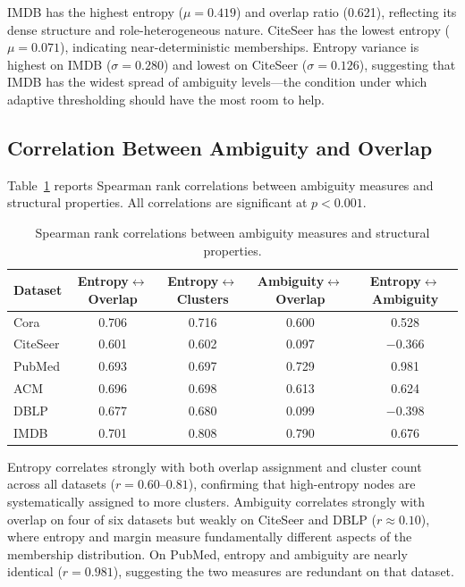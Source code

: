 \documentclass[a4paper,11pt,oneside,onecolumn,preprint]{elsarticle}
\numberwithin{equation}{section}
\begin{document}
IMDB has the highest entropy ($\mu = 0.419$) and overlap ratio (0.621), reflecting its dense structure and role-heterogeneous nature.
CiteSeer has the lowest entropy ($\mu = 0.071$), indicating near-deterministic memberships.
Entropy variance is highest on IMDB ($\sigma = 0.280$) and lowest on CiteSeer ($\sigma = 0.126$), suggesting that IMDB has the widest spread of ambiguity levels---the condition under which adaptive thresholding should have the most room to help.

\subsection{Correlation Between Ambiguity and Overlap}
\label{subsec:correlation}

Table~\ref{tab:correlations} reports Spearman rank correlations between ambiguity measures and structural properties.
All correlations are significant at $p < 0.001$.

\begin{table}[ht]
\centering
\caption{Spearman rank correlations between ambiguity measures and structural properties.}
\label{tab:correlations}
\begin{tabular}{lcccc}
\toprule
\textbf{Dataset} & \textbf{Entropy$\leftrightarrow$Overlap} & \textbf{Entropy$\leftrightarrow$Clusters} & \textbf{Ambiguity$\leftrightarrow$Overlap} & \textbf{Entropy$\leftrightarrow$Ambiguity} \\
\midrule
Cora      & 0.706 & 0.716 & 0.600 & 0.528 \\
CiteSeer  & 0.601 & 0.602 & 0.097 & $-$0.366 \\
PubMed    & 0.693 & 0.697 & 0.729 & 0.981 \\
ACM       & 0.696 & 0.698 & 0.613 & 0.624 \\
DBLP      & 0.677 & 0.680 & 0.099 & $-$0.398 \\
IMDB      & 0.701 & 0.808 & 0.790 & 0.676 \\
\bottomrule
\end{tabular}
\end{table}

Entropy correlates strongly with both overlap assignment and cluster count across all datasets ($r = 0.60$--$0.81$), confirming that high-entropy nodes are systematically assigned to more clusters.
Ambiguity correlates strongly with overlap on four of six datasets but weakly on CiteSeer and DBLP ($r \approx 0.10$), where entropy and margin measure fundamentally different aspects of the membership distribution.
On PubMed, entropy and ambiguity are nearly identical ($r = 0.981$), suggesting the two measures are redundant on that dataset.
\end{document}
